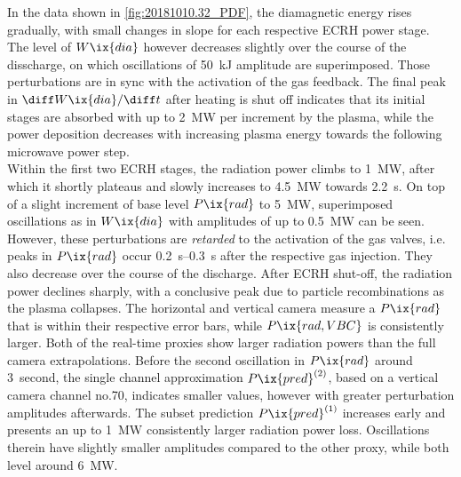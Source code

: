 %
            In the data shown in \cref{fig:20181010.32_PDF}, the diamagnetic energy rises gradually, with small changes in slope for each respective ECRH power stage. The level of $W\ix{dia}$ however decreases slightly over the course of the disscharge, on which oscillations of \SI{50}{\kilo\joule} amplitude are superimposed. Those perturbations are in sync with the activation of the gas feedback. The final peak in $\diff W\ix{dia}/\diff t$ after heating is shut off indicates that its initial stages are absorbed with up to \SI{2}{\mega\watt} per increment by the plasma, while the power deposition decreases with increasing plasma energy towards the following microwave power step. \\%
            Within the first two ECRH stages, the radiation power climbs to \SI{1}{\mega\watt}, after which it shortly plateaus and slowly increases to \SI{4.5}{\mega\watt} towards \SI{2.2}{\second}. On top of a slight increment of base level $P\ix{rad}$ to \SI{5}{\mega\watt}, superimposed oscillations as in $W\ix{dia}$ with amplitudes of up to \SI{0.5}{\mega\watt} can be seen. However, these perturbations are \textit{retarded} to the activation of the gas valves, i.e. peaks in $P\ix{rad}$ occur \SIrange{0.2}{0.3}{\second} after the respective gas injection. They also decrease over the course of the discharge. After ECRH shut-off, the radiation power declines sharply, with a conclusive peak due to particle recombinations as the plasma collapses. The horizontal and vertical camera measure a $P\ix{rad}$ that is within their respective error bars, while $P\ix{rad, VBC}$ is consistently larger. Both of the real-time proxies show larger radiation powers than the full camera extrapolations. Before the second oscillation in $P\ix{rad}$ around \SI{3}{second}, the single channel approximation $P\ix{pred}^{\left(2\right)}$, based on a vertical camera channel no.70, indicates smaller values, however with greater perturbation amplitudes afterwards. The subset prediction $P\ix{pred}^{\left(1\right)}$ increases early and presents an up to \SI{1}{\mega\watt} consistently larger radiation power loss. Oscillations therein have slightly smaller amplitudes compared to the other proxy, while both level around \SI{6}{\mega\watt}.\\%

